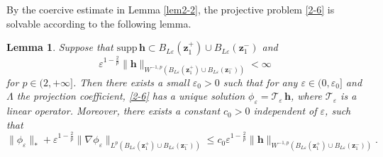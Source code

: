 \documentclass[12pt,reqno]{amsart}
\numberwithin{equation}{section}
\newtheorem{lemma}[theorem]{Lemma}
\theoremstyle{definition}
\theoremstyle{remark}
\begin{document}
	By the coercive estimate in Lemma \ref{lem2-2}, the projective problem \eqref{2-6} is solvable according to the following lemma.
	\begin{lemma}\label{lem2-3}
		Suppose that $\mathrm{supp}\, \mathbf h\subset B_{L\varepsilon}(\boldsymbol z_1^+)\cup B_{L\varepsilon}(\boldsymbol z_1^-)$ and 
		$$\varepsilon^{1-\frac{2}{p}}\|\mathbf h\|_{W^{-1,p}(B_{L\varepsilon}(\boldsymbol z_1^+)\cup B_{L\varepsilon}(\boldsymbol z_1^-))}<\infty$$
		for $p\in(2,+\infty]$. Then there exists a small $\varepsilon_0>0$ such that for any $\varepsilon\in(0,\varepsilon_0]$ and $\Lambda$ the projection coefficient, \eqref{2-6} has a unique solution $\phi_\varepsilon=\mathcal T_\varepsilon \, \mathbf h$, where $\mathcal T_\varepsilon$ is a linear operator. Moreover, there exists a constant $c_0>0$ independent of $\varepsilon$, such that
		\begin{equation}\label{2-13}
			\|\phi_\varepsilon\|_*+\varepsilon^{1-\frac{2}{p}}\|\nabla\phi_\varepsilon\|_{L^p(B_{L\varepsilon}(\boldsymbol z_1^+)\cup B_{L\varepsilon}(\boldsymbol z_1^-))}\le c_0\varepsilon^{1-\frac{2}{p}}\|\mathbf h\|_{W^{-1,p}(B_{L\varepsilon}(\boldsymbol z_1^+)\cup B_{L\varepsilon}(\boldsymbol z_1^-))}.
		\end{equation}
	\end{lemma}
\end{document}
